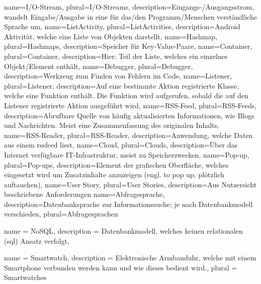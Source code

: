{
    name={I/O-Stream},
    plural={I/O-Streams},
    description={Eingangs-/Ausgangsstrom, wandelt Eingabe/Ausgabe in eine für das/den Programm/Menschen verständliche Sprache um},
}
{
    name={ListActivity},
    plural={ListActivities},
    description={Android Aktivität, welche eine Liste von Objekten darstellt},
}
{
    name={Hashmap},
    plural={Hashmaps},
    description={Speicher für Key-Value-Paare},
}
{
    name={Container},
    plural={Container},
    description={Hier: Teil der Liste, welches ein einzelnes Objekt/Element enthält},
}
{
    name={Debugger},
    plural={Debugger},
    description={Werkzeug zum Finden von Fehlern im Code},
}
{
    name={Listener},
    plural={Listener},
    description={Auf eine bestimmte Aktion registrierte Klasse, welche eine Funktion enthält. Die Funktion wird aufgerufen, sobald die auf den Listener registrierte Aktion ausgeführt wird},
}
{
    name={RSS-Feed},
    plural={RSS-Feeds},
    description={Abrufbare Quelle von häufig aktualisierten Informationen, wie Blogs und Nachrichten. Meist eine Zusammenfassung des originalen Inhalts},
}
{
    name={RSS-Reader},
    plural={RSS-Reader},
    description={Anwendung, welche Daten aus einem \gls{rssfeed} liest},
}
{
    name={Cloud},
    plural={Clouds},
    description={Über das Internet verfügbare IT-Infrastruktur, meist zu Speicherzwecken},
}
{
    name={Pop-up},
    plural={Pop-ups},
    description={Element der grafischen Oberfläche, welches eingesetzt wird um Zusatzinhalte anzuzeigen (engl. \glqq{}to pop up\grqq{}, \glqq{}plötzlich auftauchen\grqq{})},
}
{
    name={User Story},
    plural={User Stories},
    description={Aus Nutzersicht beschriebene Anforderungen}
}
{
    name={Abfragesprache},
    description={Datenbanksprache zur Informationssuche; je nach Datenbankmodell verschieden},
    plural={Abfragesprachen}
}

{
    name = {NoSQL},
    description = {Datenbankmodell, welches keinen relationalen (\gls{sql}) Ansatz verfolgt},
}

{
    name = {Smartwatch},
    description = {Elektronische Armbanduhr, welche mit einem Smartphone verbunden werden kann und wie dieses bedient wird.},
    plural = {Smartwatches}
}


